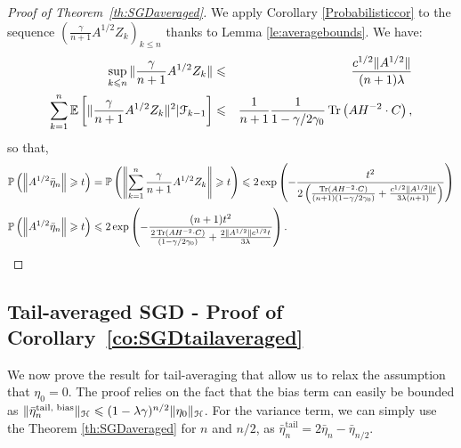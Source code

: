 \begin{proof}[Proof of Theorem~\ref{th:SGDaveraged}]
We apply Corollary \ref{Probabilisticcor} to the sequence $\left(\displaystyle\frac{\gamma}{n+1} A^{1/2}Z_k\right)_{k \leqslant n}$ thanks to Lemma \ref{le:averagebounds}. We have:
\begin{eqnarray*}
\sup_{k \leqslant n} \| \frac{\gamma}{n+1} A^{1/2}Z_k \| &\leqslant& \frac{c^{1/2} \|A^{1/2}\| }{(n+1) \lambda} \\
\sum_{k = 1}^n {\mathbb E} \left[ \|\frac{\gamma}{n+1} A^{1/2} Z_k\|^2 | \mathcal{F}_{k-1} \right] &\leqslant& \frac{1}{n+1}\frac{1}{1-\gamma/2\gamma_0} \operatorname{Tr} \left(AH^{-2}\cdot C \right),
\end{eqnarray*}
so that, 
\begin{align*}
{\mathbb P} \left( \left\| A^{1/2}\bar{\eta}_n  \right\| \geqslant t \right) &= {\mathbb P} \left( \left\| \sum_{k = 1}^n \displaystyle\frac{\gamma}{n+1}A^{1/2}Z_k  \right\| \geqslant t \right) \leqslant 2 \exp\left(-\frac{t^2}{2\left( \frac{\operatorname{Tr} \left(AH^{-2}\cdot C \right)}{(n+1)(1-\gamma/2\gamma_0)}   + \frac{c^{1/2} \|A^{1/2}\| t}{3 \lambda(n+1)}  \right)}\right)\\ 
{\mathbb P} \left( \left\| A^{1/2}\bar{\eta}_n  \right\| \geqslant t \right) &\leqslant 2 \exp\left(-\frac{(n+1)t^2}{ \frac{2\operatorname{Tr} \left(AH^{-2}\cdot C \right)}{(1-\gamma/2\gamma_0)}   + \frac{2 \|A^{1/2}\|c^{1/2} t }{3 \lambda } }\right).
\end{align*}
\end{proof}

\subsection{Tail-averaged SGD - Proof of Corollary~\ref{co:SGDtailaveraged}}
\label{ap:SGDcorrolary}

We now prove the result for tail-averaging that allow us to relax the assumption that $\eta_0 = 0$. The proof relies on the fact that the bias term can easily be bounded as $\| \bar{\eta}_n^{\textrm {tail, bias}} \|_{\mathcal H} \leqslant ( 1- \lambda \gamma )^{n/2} \|\eta_0\|_{\mathcal H}$. For the variance term, we can simply use the Theorem \ref{th:SGDaveraged} for $n$ and $n/2$, as 
$\bar{\eta}_n^{\textrm {tail}}  = 2 \bar{\eta}_n  - \bar{\eta}_{n/2}$.

